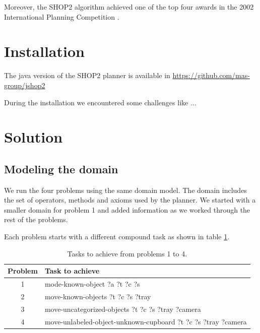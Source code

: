 \documentclass[paper=a4, fontsize=11pt]{scrartcl}
\begin{document}
 	Moreover, the SHOP2 algorithm achieved one of the top four awards in the 2002 International Planning Competition \cite{Nau2003}.
 	
 	\section{Installation}
 	
 	The java version of the SHOP2 planner is available in \url{https://github.com/mas-group/jshop2}
 	
 	
 	During the installation we encountered some challenges like ... 

	
	\section{Solution}
	
	\subsection{Modeling the domain}
	
	We run the four problems using the same domain model. The domain includes the set of operators, methods and axioms used by the planner. We started with a smaller domain for problem 1 and added information as we worked through the rest of the problems. 
	
	Each problem starts with a different compound task as shown in table \ref{table:compund-tasks}.
	
	\begin{table}[h!]
		
	\centering
		
	\begin{tabular}{cl}
		\toprule   
		
		Problem & Task to achieve \\
		\midrule
		
		1 & mode-known-object ?a ?t ?c ?s \\
		
		\midrule
		
		2 & move-known-objects ?t ?c ?s ?tray \\
		
		\midrule
		
		3 & move-uncategorized-objects ?t ?c ?s ?tray ?camera \\
		
		\midrule
		
		4 & move-unlabeled-object-unknown-cupboard ?t ?c ?s ?tray ?camera \\
	
		\bottomrule
	\end{tabular}
	\caption{Tasks to achieve from problems 1 to 4.} 
	\label{table:compund-tasks}
	\end{table}
	
\end{document}
